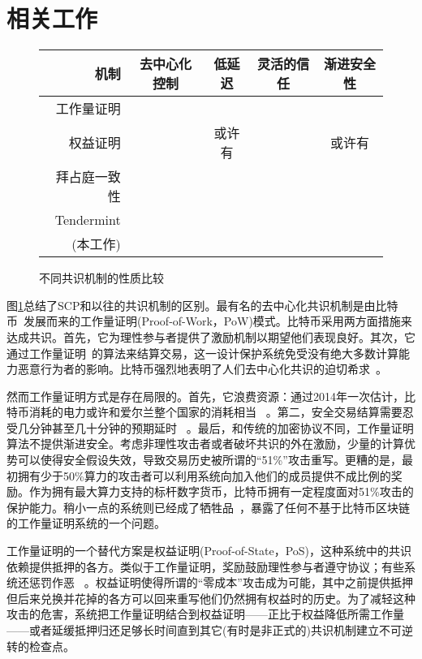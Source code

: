 \section{相关工作}

\begin{figure}
\centering
{}
\begin{tabu}{r<{\quad}cccc}
  \toprule
  \rowfont\bfseries
	机制 &	去中心化控制 &	低延迟 &	灵活的信任 &	渐进安全性\\
	\midrule
	工作量证明 & \checkmark &&& \\
	权益证明 & \checkmark & 或许有 && 或许有	\\
	拜占庭一致性 && \checkmark & \checkmark & \checkmark \\
	Tendermint & \checkmark & \checkmark && \checkmark \\
	{\FBA}(本工作) & \checkmark & \checkmark & \checkmark & \checkmark \\ 
	\bottomrule
\end{tabu}
\caption{不同共识机制的性质比较}
\label{fig:relwk}
\end{figure}


图\ref{fig:relwk}总结了SCP和以往的共识机制的区别。最有名的去中心化共识机制是由比特币~发展而来的工作量证明(Proof-of-Work，PoW)模式。比特币采用两方面措施来达成共识。首先，它为理性参与者提供了激励机制以期望他们表现良好。其次，它通过工作量证明~的算法来结算交易，这一设计保护系统免受没有绝大多数计算能力恶意行为者的影响。比特币强烈地表明了人们去中心化共识的迫切希求~。

然而工作量证明方式是存在局限的。首先，它浪费资源：通过2014年一次估计，比特币消耗的电力或许和爱尔兰整个国家的消耗相当~ 。第二，安全交易结算需要忍受几分钟甚至几十分钟的预期延时~ 。最后，和传统的加密协议不同，工作量证明算法不提供渐进安全。考虑非理性攻击者或者破坏共识的外在激励，少量的计算优势可以使得安全假设失效，导致交易历史被所谓的``51\%''攻击重写。更糟的是，最初拥有少于50\%算力的攻击者可以利用系统向加入他们的成员提供不成比例的奖励。作为拥有最大算力支持的标杆数字货币，比特币拥有一定程度面对51\%攻击的保护能力。稍小一点的系统则已经成了牺牲品~，暴露了任何不基于比特币区块链的工作量证明系统的一个问题。

工作量证明的一个替代方案是权益证明(Proof-of-State，PoS)，这种系统中的共识依赖提供抵押的各方。类似于工作量证明，奖励鼓励理性参与者遵守协议；有些系统还惩罚作恶~ 。权益证明使得所谓的``零成本''攻击成为可能，其中之前提供抵押但后来兑换并花掉的各方可以回来重写他们仍然拥有权益时的历史。为了减轻这种攻击的危害，系统把工作量证明结合到权益证明——正比于权益降低所需工作量——或者延缓抵押归还足够长时间直到其它(有时是非正式的)共识机制建立不可逆转的检查点。

